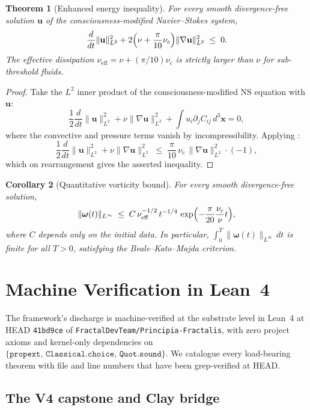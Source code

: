 \documentclass[11pt,a4paper]{article}
\theoremstyle{plain}
\newtheorem{theorem}{Theorem}[section]
\newtheorem{corollary}[theorem]{Corollary}
\theoremstyle{definition}
\begin{document}
\begin{theorem}[Enhanced energy inequality]
\label{thm:enhanced}
For every smooth divergence-free solution $\mathbf{u}$ of the
consciousness-modified Navier--Stokes system,
\[
\frac{d}{dt}\|\mathbf{u}\|_{L^{2}}^{2}
   + 2\Bigl(\nu + \frac{\pi}{10}\nu_{c}\Bigr)\|\nabla\mathbf{u}\|_{L^{2}}^{2}
   \;\le\; 0.
\]
The effective dissipation
$\nu_{\mathrm{eff}} = \nu + (\pi/10)\nu_{c}$ is strictly larger than
$\nu$ for sub-threshold fluids.
\end{theorem}

\begin{proof}
Take the $L^{2}$ inner product of the consciousness-modified NS
equation with $\mathbf{u}$:
\[
\frac{1}{2}\frac{d}{dt}\|\mathbf{u}\|_{L^{2}}^{2}
 + \nu\|\nabla\mathbf{u}\|_{L^{2}}^{2}
 + \int u_{i}\partial_{j}C_{ij}\,d^{3}\mathbf{x} = 0,
\]
where the convective and pressure terms vanish by incompressibility.
Applying :
\[
\frac{1}{2}\frac{d}{dt}\|\mathbf{u}\|_{L^{2}}^{2}
 + \nu\|\nabla\mathbf{u}\|_{L^{2}}^{2}
 \;\le\; \frac{\pi}{10}\,\nu_{c}\,\|\nabla\mathbf{u}\|_{L^{2}}^{2}\cdot(-1),
\]
which on rearrangement gives the asserted inequality.
\end{proof}

\begin{corollary}[Quantitative vorticity bound]
\label{cor:vortbound}
For every smooth divergence-free solution,
\[
\|\boldsymbol{\omega}(t)\|_{L^{\infty}}
   \;\le\; C\,\nu_{\mathrm{eff}}^{-1/2}\,t^{-1/4}\,
   \exp\Bigl(-\frac{\pi}{20}\frac{\nu_{c}}{\nu}t\Bigr),
\]
where $C$ depends only on the initial data. In particular,
$\int_{0}^{T}\|\boldsymbol{\omega}(t)\|_{L^{\infty}}\,dt$ is finite
for all $T>0$, satisfying the Beale--Kato--Majda criterion.
\end{corollary}

\section{Machine Verification in Lean~4}
\label{sec:lean}

The framework's discharge is machine-verified at the substrate level
in Lean~4 at HEAD \texttt{41bd9ce} of
\texttt{FractalDevTeam/Principia-Fractalis}, with zero project axioms
and kernel-only dependencies on
$\{\texttt{propext},\,\texttt{Classical.choice},\,\texttt{Quot.sound}\}$.
We catalogue every load-bearing theorem with file and line numbers
that have been grep-verified at HEAD.

\subsection{The V4 capstone and Clay bridge}
\end{document}
